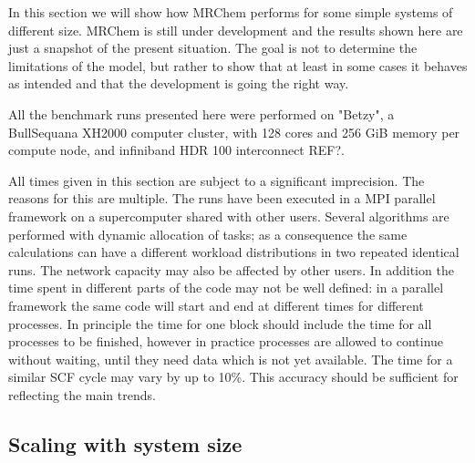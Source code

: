 \documentclass[%
 aip,
 amsmath,amssymb,
 reprint,%
]{revtex4-1}
\begin{document}
In this section we will show how MRChem performs for some simple systems of different size. MRChem is still under development and the results shown here are just a snapshot of the present situation. The goal is not to determine the limitations of the model, but rather to show that at least in some cases it behaves as intended and that the development is going the right way.

All the benchmark runs presented here were performed on "Betzy", a BullSequana XH2000 computer cluster, with 128 cores and 256 GiB memory per compute node, and infiniband HDR 100 interconnect REF?.

All times given in this section are subject to a significant imprecision. The reasons for this are multiple. The runs have been executed in a MPI parallel framework on a supercomputer shared with other users. Several algorithms are performed with dynamic allocation of tasks; as a consequence the same calculations can have a different workload distributions in two repeated identical runs. The network capacity may also be affected by other users. In addition the time spent in different parts of the code may not be well defined: in a parallel framework the same code will start and end at different times for different processes. In principle the time for one block should include the time for all processes to be finished, however in practice processes are allowed to continue without waiting, until they need data which is not yet available.
The time for a similar SCF cycle may vary by up to 10\%. This accuracy should be sufficient for reflecting the main trends. 

\subsection{Scaling with system size}
\end{document}
